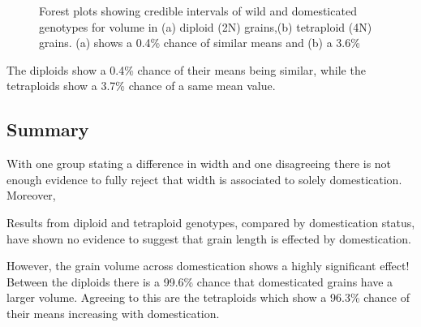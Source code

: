 \documentclass[11pt]{report}
\begin{document}
\begin{figure}[!ht]
  \hfill
  \caption{Forest plots showing credible intervals of wild and domesticated genotypes for volume in (a) diploid (2N) grains,(b) tetraploid (4N) grains. (a) shows a 0.4\% chance of similar means  and (b) a 3.6\%}
  \label{fig:lenmeansvolume}
\end{figure}

The diploids show a 0.4\% chance of their means being similar, while the tetraploids show a 3.7\% chance of a same mean value.

\subsection{Summary}
\label{sec:org3cc6b0d}
With one group stating a difference in width and one disagreeing there is not enough evidence to fully reject that width is associated to solely domestication. Moreover,

Results from diploid and tetraploid genotypes, compared by domestication status, have shown no evidence to suggest that grain length is effected by domestication.

However, the grain volume across domestication shows a highly significant effect! Between the diploids there is a 99.6\% chance that domesticated grains have a larger volume. Agreeing to this are the tetraploids which show a 96.3\% chance of their means increasing with domestication.
\end{document}
